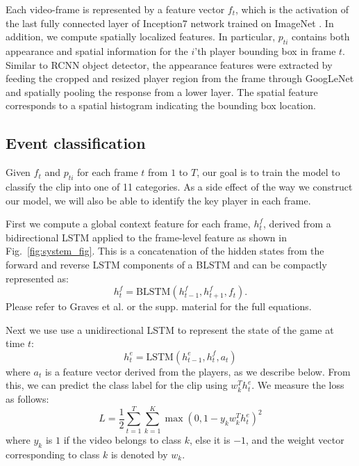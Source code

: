 Each video-frame  is represented by a feature vector $f_t$, which is the activation
of the last fully connected layer of Inception7 network 
\cite{} trained on ImageNet \cite{}.  In addition, we compute spatially localized features.  In particular,
$p_{ti}$ contains both appearance and spatial information for the $i$'th
player bounding box in frame $t$. Similar to RCNN object detector\cite{},
the appearance features were extracted by feeding
the cropped and resized player region from the frame through GoogLeNet and
spatially pooling the response from a lower layer. The spatial feature
corresponds to a spatial histogram indicating the bounding box location.

\subsection{Event classification}

Given $f_t$ and $p_{ti}$ for each frame $t$ from $1$ to $T$, our goal
is to train the model to classify the clip into one of 11 categories. As a side
effect of the way we construct our model, we will also be able to identify the
key player in each frame.

First we compute a global context feature for each frame, $h_t^f$, derived from
a bidirectional LSTM applied to the frame-level feature as shown in Fig.~\ref{fig:system_fig}.
This is a concatenation of the hidden states from the forward and reverse LSTM
components of a BLSTM and can be compactly represented as:
\[
h_t^f = \mbox{BLSTM}(h_{t-1}^f, h_{t+1}^f, f_t).
\]Please refer to Graves et al. \cite{Graves_2013} or the supp. material
for the full equations.

Next we use use a unidirectional LSTM to represent the state of the
game at time $t$:
\[
h_t^e = \mbox{LSTM}(h_{t-1}^e, h_t^f, a_t)
\]
where $a_t$ is a feature vector derived from the players, as we
describe below.
From this, we can predict the class label for the clip using $w_k^T
h_t^e$. We measure the loss as follows:
\begin{equation}
  L =   \frac{1}{2} \sum_{t=1}^T \sum_{k = 1}^K \max (0, 1 - y_k w_k^T h^e_t)^2
\end{equation} 
where $y_k$ is $1$ if the video belongs to class $k$,
else it is $-1$, and the weight vector corresponding to
class $k$ is denoted by $w_k$.

